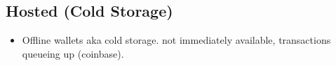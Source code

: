 

\subsection{Hosted (Cold Storage)} 

\begin{itemize}
  \item Offline wallets aka cold storage. not immediately available, transactions queueing up (coinbase). 
\end{itemize}

